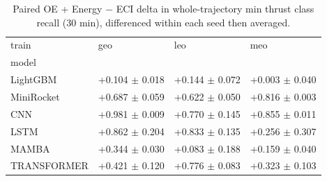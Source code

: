 \begin{table}
\caption{Paired OE + Energy $-$ ECI delta in whole-trajectory min thrust class recall (30 min), differenced within each seed then averaged.}
\label{tab:total_featdelta_minrec_phys}
\begin{tabular}{llll}
\toprule
train & geo & leo & meo \\
model &  &  &  \\
\midrule
LightGBM & +0.104 $\pm$ 0.018 & +0.144 $\pm$ 0.072 & +0.003 $\pm$ 0.040 \\
MiniRocket & +0.687 $\pm$ 0.059 & +0.622 $\pm$ 0.050 & +0.816 $\pm$ 0.003 \\
CNN & +0.981 $\pm$ 0.009 & +0.770 $\pm$ 0.145 & +0.855 $\pm$ 0.011 \\
LSTM & +0.862 $\pm$ 0.204 & +0.833 $\pm$ 0.135 & +0.256 $\pm$ 0.307 \\
MAMBA & +0.344 $\pm$ 0.030 & +0.083 $\pm$ 0.188 & +0.159 $\pm$ 0.040 \\
TRANSFORMER & +0.421 $\pm$ 0.120 & +0.776 $\pm$ 0.083 & +0.323 $\pm$ 0.103 \\
\bottomrule
\end{tabular}
\end{table}
